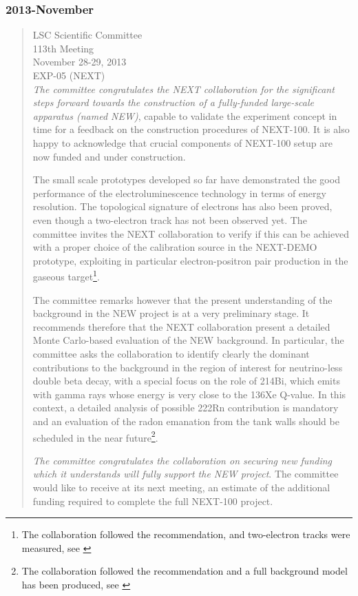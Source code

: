 \subsubsection*{2013-November}
\begin{quotation}
LSC Scientific Committee \\
113th Meeting\\
November 28-29, 2013\\

EXP-05 (NEXT)\\

{\em The committee congratulates the NEXT collaboration for the significant steps forward towards the construction of a fully-funded large-scale apparatus (named NEW)}, capable to validate the experiment concept in time for a feedback on the construction procedures of NEXT-100. It is also happy to acknowledge that crucial components of NEXT-100 setup are now funded and under construction.

The small scale prototypes developed so far have demonstrated the good performance of the electroluminescence technology in terms of energy resolution. The topological signature of electrons has also been proved, even though a two-electron track has not been observed yet. The committee invites the NEXT collaboration to verify if this can be achieved with a proper choice of the calibration source in the NEXT-DEMO prototype, exploiting in particular electron-positron pair production in the gaseous target\footnote{The collaboration followed the recommendation, and two-electron tracks were measured, see \cite{Ferrario:2015kta}}.

The committee remarks however that the present understanding of the background in the NEW project is at a very preliminary stage. It recommends therefore that the NEXT collaboration present a detailed Monte Carlo-based evaluation of the NEW background. In particular, the committee asks the collaboration to identify clearly the dominant contributions to the background in the region of interest for neutrino-less double beta decay, with a special focus on the role of 214Bi, which emits with gamma rays whose energy is very close to the 136Xe Q-value. In this context, a detailed analysis of possible 222Rn contribution is mandatory and an evaluation of the radon emanation from the tank walls should be scheduled in the near future\footnote{The collaboration followed the recommendation and a full
background model has been produced, see \cite{Martin-Albo:2015rhw}}.

{\em The committee congratulates the collaboration on securing new funding which it understands will fully support the NEW project}. The committee would like to receive at its next meeting, an estimate of the additional funding required to complete the full NEXT-100 project.
\end{quotation}

